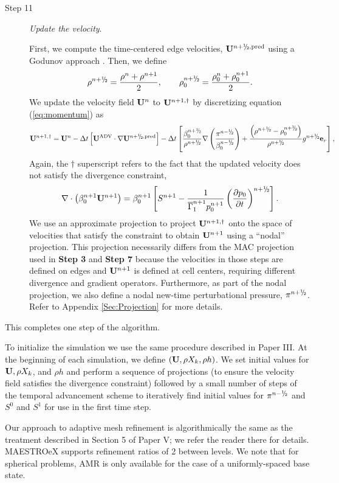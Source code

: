 \begin{description}
\begin{enumerate}
\end{enumerate}


\item[Step 11] {\em Update the velocity}.

First, we compute the time-centered edge velocities, $\Ub^{\nph,\pred}$
using a Godunov approach \citep{XRB_III}. Then, we define
\begin{equation}
\rho^\nph = \frac{\rho^n + \rho^{n+1}}{2}, \qquad \rho_0^\nph = \frac{\rho_0^n + \rho_0^{n+1}}{2}.
\end{equation}
We update the velocity field ${\bf{U}}^n$ to ${\bf{U}}^{n+1,\dagger}$ by discretizing
equation (\ref{eq:momentum}) as
\begin{equation}
\Ub^{n+1,\dagger}
= \Ub^n - \dt \left[\uadvtwo \cdot \nabla \Ub^{\nph,\pred} \right]
 - \dt \left[ \frac{\beta_0^\nph}{\rho^\nph} \nabla \left( \frac{\pi^\nmh}{\beta_0^\nmh} \right) + \frac{\left(\rho^\nph-\rho_0^\nph\right)}{\rho^\nph} g^{\nph} \eb_r \right],
\end{equation}
Again, the $\dagger$ superscript refers
to the fact that the updated velocity does not satisfy the divergence constraint,
\begin{equation}
\nabla \cdot \left(\beta_0^{n+1} \Ub^{n+1} \right) = \beta_0^{n+1} \left[ S^{n+1} - \frac{1}{\gammaonebar^{n+1}p_0^{n+1}}\left(\frac{\partial p_0}{\partial t}\right)^{\nph}\right].\label{eq:div3}
\end{equation}
We use an approximate projection to project ${\bf{U}}^{n+1,\dagger}$ onto the space of velocities that satisfy the constraint to obtain ${\bf{U}}^{n+1}$ using a ``nodal'' projection.
This projection necessarily differs from the MAC projection used in
{\bf Step 3} and {\bf Step 7} because the velocities in those steps are defined
on edges and ${\bf{U}}^{n+1}$ is defined at cell centers, requiring different divergence
and gradient operators.
Furthermore, as part of the nodal projection, we also define a nodal new-time perturbational pressure, $\pi^\nph$.
Refer to Appendix \ref{Sec:Projection} for more details.

\end{description}
This completes one step of the algorithm.

To initialize the simulation we use the same procedure described in Paper III.
At the beginning of each simulation, we define $({\bf{U}},\rho X_k,\rho h)$.
We set initial values for ${\bf{U}}, \rho X_k$, and $\rho h$ and perform a sequence of projections 
(to ensure the velocity field satisfies the divergence constraint) 
followed by a small number of steps of the temporal advancement scheme to iteratively 
find initial values for $\pi^{n-\myhalf}$ and $S^0$ and $S^1$ for use in the first time step.

Our approach to adaptive mesh refinement is algorithmically the same as the treatment described in Section 5 of Paper V; we refer the reader there for details.
MAESTROeX supports refinement ratios of 2 between levels.
We note that for spherical problems, AMR is only available for the case of a uniformly-spaced base state.
